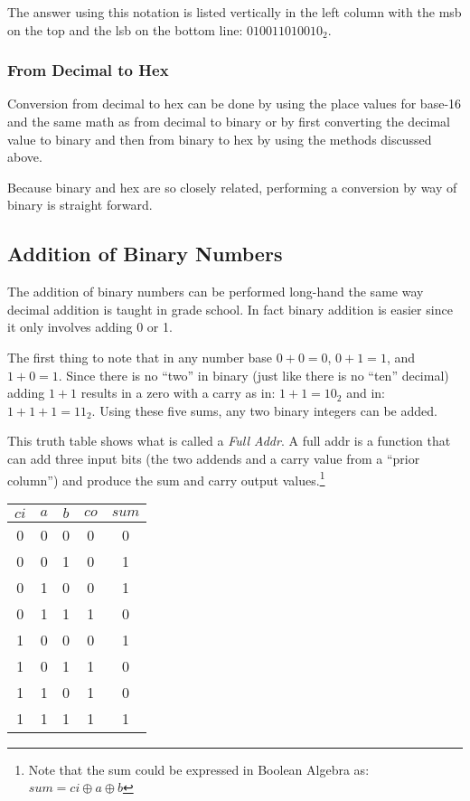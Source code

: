 The answer using this notation is listed vertically
in the left column with the \acrshort{msb} on the top and 
the \acrshort{lsb} on the bottom line: $010011010010_2$.


\subsubsection{From Decimal to Hex}

Conversion from decimal to hex can be done by using the place
values for base-16 and the same math as from decimal to binary
or by first converting the decimal value to binary and then
from binary to hex by using the methods discussed above.

Because binary and hex are so closely related, performing
a conversion by way of binary is straight forward.


\subsection{Addition of Binary Numbers}

The addition of binary numbers can be performed long-hand the
same way decimal addition is taught in grade school.  In fact binary
addition is easier since it only involves adding 0 or 1.

The first thing to note that in any number base $0+0=0$, $0+1=1$, and 
$1+0=1$.  Since there is no ``two'' in binary (just like there is 
no ``ten'' decimal) adding $1+1$ results in a zero with a carry as
in: $1+1=10_2$ and in: $1+1+1=11_2$.  Using these five sums, any two
binary integers can be added.

%
This truth table shows what is called a {\em Full Addr}.
A full addr is a function that can add three input bits 
(the two addends and a carry value from a ``prior column'')
and produce the sum and carry output values.\footnote{
Note that the sum could be expressed in Boolean Algebra as:
$sum = ci \oplus{} a \oplus{} b$}

\begin{center}
\begin{tabular}{|ccc|cc|}
\hline
$ci$ & $a$ & $b$ & $co$ & $sum$\\
\hline
 0 & 0 & 0 &   0 & 0 \\
 0 & 0 & 1 &   0 & 1 \\
 0 & 1 & 0 &   0 & 1 \\
 0 & 1 & 1 &   1 & 0 \\
 1 & 0 & 0 &   0 & 1 \\
 1 & 0 & 1 &   1 & 0 \\
 1 & 1 & 0 &   1 & 0 \\
 1 & 1 & 1 &   1 & 1 \\
\hline
\end{tabular}
\end{center}

